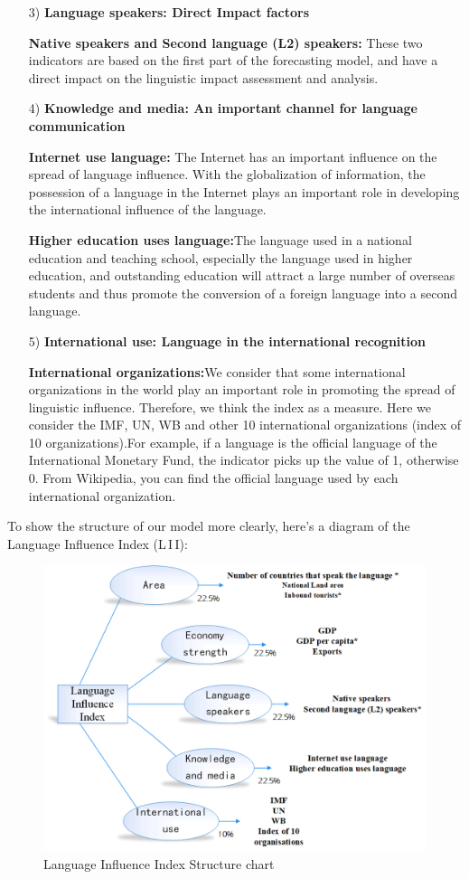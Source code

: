 \begin{enumerate}
	\item[3)] \textbf{Language speakers: Direct Impact factors}
	\par \textbf{Native speakers and Second language (L2) speakers:} These two indicators are based on the first part of the forecasting model, and have a direct impact on the linguistic impact assessment and analysis.
	
	\item[4)] \textbf{Knowledge and media: An important channel for language communication}
	\par\textbf{Internet use language: } The Internet has an important influence on the spread of language influence. With the globalization of information, the possession of a language in the Internet plays an important role in developing the international influence of the language.
	\par \textbf{Higher education uses language:}The language used in a national education and teaching school, especially the language used in higher education, and outstanding education will attract a large number of overseas students and thus promote the conversion of a foreign language into a second language.
	
	\item[5)] \textbf{International use: Language in the international recognition}
	\par \textbf{International organizations:}We consider that some international organizations in the world play an important role in promoting the spread of linguistic influence. Therefore, we think the index as a measure. Here we consider the IMF, UN, WB and other 10 international organizations (index of 10 organizations).For example, if a language is the official language of the International Monetary Fund, the indicator picks up the value of 1, otherwise 0. From Wikipedia, you can find the official language used by each international organization.
	
\end{enumerate}

\par To show the structure of our model more clearly, here's a diagram of the Language Influence Index (L\,I\,I):

\begin{figure}[htpb]
	\centering
	\includegraphics[width=0.7\linewidth]{figures/chart}
	\caption{Language Influence Index Structure chart}
	\label{fig:chart}
\end{figure}


